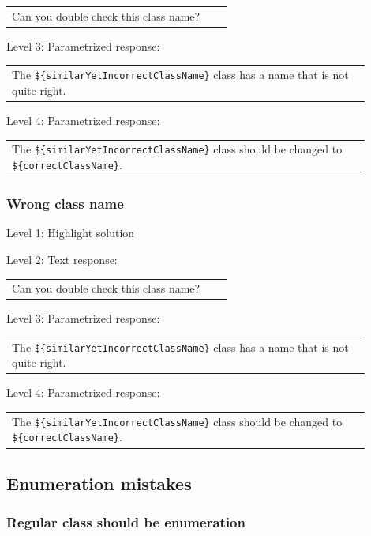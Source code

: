 \begin{tabular}{|p{0.9\linewidth}}
Can you double check this class name?
\end{tabular} \medskip

\noindent Level 3: Parametrized response: \medskip

\begin{tabular}{|p{0.9\linewidth}}
The \verb|${similarYetIncorrectClassName}| class has a name that is not quite right.
\end{tabular} \medskip

\noindent Level 4: Parametrized response: \medskip

\begin{tabular}{|p{0.9\linewidth}}
The \verb|${similarYetIncorrectClassName}| class should be changed to \verb|${correctClassName}|.
\end{tabular} \medskip


\subsubsection{Wrong class name}

\noindent Level 1: Highlight solution \medskip

\noindent Level 2: Text response: \medskip

\begin{tabular}{|p{0.9\linewidth}}
Can you double check this class name?
\end{tabular} \medskip

\noindent Level 3: Parametrized response: \medskip

\begin{tabular}{|p{0.9\linewidth}}
The \verb|${similarYetIncorrectClassName}| class has a name that is not quite right.
\end{tabular} \medskip

\noindent Level 4: Parametrized response: \medskip

\begin{tabular}{|p{0.9\linewidth}}
The \verb|${similarYetIncorrectClassName}| class should be changed to \verb|${correctClassName}|.
\end{tabular} \medskip


\subsection{Enumeration mistakes}

\subsubsection{Regular class should be enumeration}

